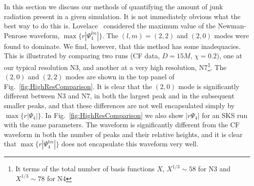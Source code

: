 In this section we discuss our methods of
quantifying the amount of junk radiation present in a given
simulation. It is not immediately obvious what the best way to do this
is.  Lovelace~\cite{Lovelace2009} considered the
maximum value of the Newman-Penrose waveform, $\max\{r|\Psi_4^{lm}|\}$.  The
  $(l,m)=(2,2)$ and $(2,0)$ modes were found to dominate. We find,
  however, that this method has some inadequacies. This is illustrated
  by comparing two runs (CF data, $D=15M$, $\chi=0.2$), one at our
  typical resolution N3, and another at a very high
  resolution, N7\footnote{It terms of the total number of basis
    functions $X$, $X^{1/3}\sim58$ for N3 and $X^{1/3}\sim78$ for
    N4}. The $(2,0)$ and $(2,2)$ modes are shown in the top panel of
  Fig.~\ref{fig:HighResComparison}. It is clear that the $(2,0)$ mode
  is significantly different between N3 and N7, in both the
  largest peak and in the subsequent smaller peaks, and that these
  differences are not well encapsulated simply by
  $\max\{r|\Psi_4|\}$. In Fig.~\ref{fig:HighResComparison} we also
  show $|r\Psi_4|$ for an SKS run with the same parameters. The
  waveform is significantly different from the CF waveform in both the
  number of peaks and their relative heights, and it is clear that
  $\max\{r|\Psi_4^{lm}|\}$ does not encapsulate this waveform very well.


